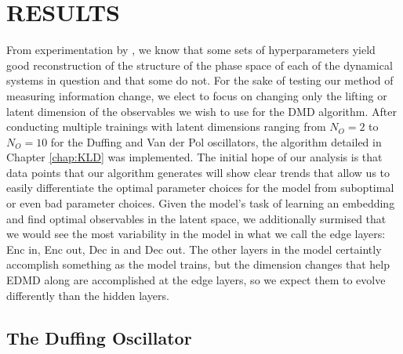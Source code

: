 \chapter{RESULTS}
\label{chap:results}
From experimentation by \cite{lago}, we know that some sets of hyperparameters yield good reconstruction
of the structure of the phase space of each of the dynamical systems in question and that some do not. For
the sake of testing our method of measuring information change, we elect to focus on changing only the 
lifting or latent dimension of the observables we wish to use for the DMD algorithm. After conducting 
multiple trainings with latent dimensions ranging from $N_O = 2$ to $N_O = 10$ for the Duffing and Van der 
Pol oscillators, the algorithm detailed in Chapter \ref{chap:KLD} was implemented. The initial hope of our 
analysis is that data points that our algorithm generates 
will show clear trends that allow us to easily differentiate the optimal parameter choices for the 
model from suboptimal or even bad parameter choices. Given the model's task of learning an embedding and 
find optimal observables in the latent space, we additionally surmised that we would see the most 
variability in the model in what we call the edge layers: Enc in, Enc out, Dec in and Dec out. The 
other layers in the model certaintly accomplish something as the model trains, but the dimension changes 
that help EDMD along are accomplished at the edge layers, so we expect them to evolve differently than
the hidden layers. 



\section{The Duffing Oscillator}
\label{section:duffing results}

